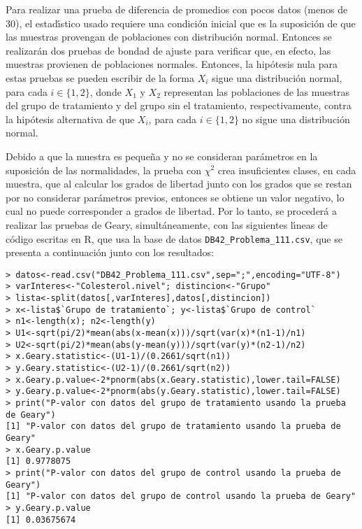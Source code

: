\begin{solucion}
 Para realizar una prueba de diferencia de promedios con pocos datos
 (menos de 30), el estad\'{\i}stico usado requiere una condici\'on inicial
 que es la suposici\'on de que las muestras provengan de poblaciones
 con distribuci\'on normal.
 Entonces se realizar\'an dos pruebas de bondad de ajuste
 para verificar que, en efecto, las muestras provienen de poblaciones
 normales. Entonces, la hip\'otesis nula para estas pruebas se pueden
 escribir de la forma
 $X_i$ sigue una distribuci\'on normal, para cada $i \in \{1,2\}$,
 donde $X_1$ y $X_2$ representan las poblaciones de las muestras
 del grupo de tratamiento y del grupo sin el tratamiento,
 respectivamente, contra la hip\'otesis alternativa
 de que $X_i$, para cada $i \in \{1,2\}$ no sigue una distribuci\'on
 normal.
 \par 
 Debido a que la muestra es peque\~na y no se consideran par\'ametros
 en la suposici\'on de las normalidades,
 la prueba con $\chi^2$ crea insuficientes clases, en cada muestra,
 que al calcular los grados de libertad junto con los grados que se restan
 por no considerar par\'ametros previos, entonces se obtiene
 un valor negativo, lo cual no puede corresponder a grados de libertad.
 Por lo tanto, se proceder\'a a realizar las pruebas de Geary,
 simult\'aneamente, con las siguientes l\'{\i}neas de c\'odigo
 escritas en R, que usa la base de datos
 \texttt{DB42\_Problema\_111.csv},
 que se presenta a continuaci\'on junto con los resultados:
 \begin{verbatim}
> datos<-read.csv("DB42_Problema_111.csv",sep=";",encoding="UTF-8")
> varInteres<-"Colesterol.nivel"; distincion<-"Grupo"
> lista<-split(datos[,varInteres],datos[,distincion])
> x<-lista$`Grupo de tratamiento`; y<-lista$`Grupo de control`
> n1<-length(x); n2<-length(y)
> U1<-sqrt(pi/2)*mean(abs(x-mean(x)))/sqrt(var(x)*(n1-1)/n1)
> U2<-sqrt(pi/2)*mean(abs(y-mean(y)))/sqrt(var(y)*(n2-1)/n2)
> x.Geary.statistic<-(U1-1)/(0.2661/sqrt(n1))
> y.Geary.statistic<-(U2-1)/(0.2661/sqrt(n2))
> x.Geary.p.value<-2*pnorm(abs(x.Geary.statistic),lower.tail=FALSE)
> y.Geary.p.value<-2*pnorm(abs(y.Geary.statistic),lower.tail=FALSE)
> print("P-valor con datos del grupo de tratamiento usando la prueba de Geary")
[1] "P-valor con datos del grupo de tratamiento usando la prueba de Geary"
> x.Geary.p.value
[1] 0.9778075
> print("P-valor con datos del grupo de control usando la prueba de Geary")
[1] "P-valor con datos del grupo de control usando la prueba de Geary"
> y.Geary.p.value
[1] 0.03675674
 \end{verbatim}

\end{solucion}
